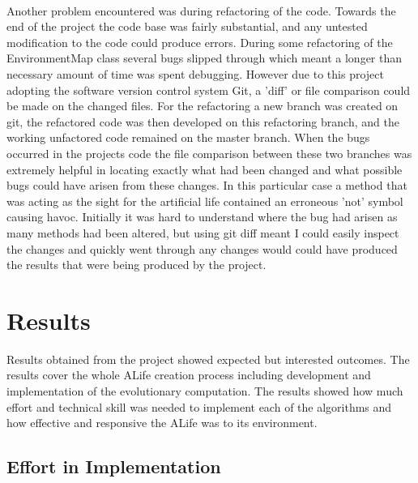 \documentclass[12pt]{article}
\begin{document}
\paragraph{}
Another problem encountered was during refactoring of the code. Towards the end of the project the code base was fairly substantial, and any
untested modification to the code could produce errors. During some refactoring of the EnvironmentMap class several bugs slipped through
which meant a longer than necessary amount of time was spent debugging. However due to this project adopting the software version control system
Git, a 'diff' or file comparison could be made on the changed files. For the refactoring a new branch was created on git, the refactored code
was then developed on this refactoring branch, and the working unfactored code remained on the master branch. When the bugs occurred in the
projects code the file comparison between these two branches was extremely helpful in locating exactly what had been changed and what
possible bugs could have arisen from these changes. In this particular case a method that was acting as the sight for the artificial life
contained an erroneous 'not' symbol causing havoc. Initially it was hard to understand where the bug had arisen as many methods had been
altered, but using git diff meant I could easily inspect the changes and quickly went through any changes would could have produced the
results that were being produced by the project.

\section{Results}

Results obtained from the project showed expected but interested outcomes. The results cover the whole ALife creation process including
development and implementation of the evolutionary computation. The results showed how much effort and technical skill was needed to
implement each of the algorithms and how effective and responsive the ALife was to its environment.

\subsection{Effort in Implementation}
\end{document}
